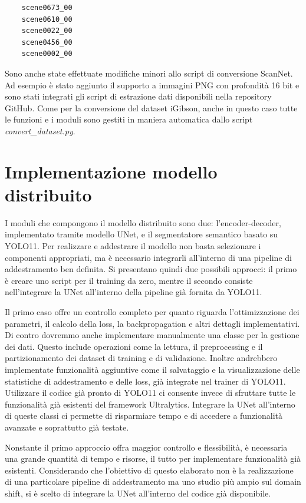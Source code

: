\documentclass[12pt]{report}
\begin{document}
\begin{verbatim}
	scene0673_00
	scene0610_00
	scene0022_00
	scene0456_00
	scene0002_00
\end{verbatim}

Sono anche state effettuate modifiche minori allo script di conversione ScanNet. Ad esempio è stato aggiunto il supporto a immagini PNG con profondità 16 bit e sono stati integrati gli script di estrazione dati disponibili nella repository GitHub. Come per la conversione del dataset iGibson, anche in questo caso tutte le funzioni e i moduli sono gestiti in maniera automatica dallo script \textit{convert\_dataset.py}.

\section{Implementazione modello distribuito}
\label{sec:implementazione_modello_per_distribuito}

I moduli che compongono il modello distribuito sono due: l'encoder-decoder, implementato tramite modello UNet, e il segmentatore semantico basato su YOLO11. Per realizzare e addestrare il modello non basta selezionare i componenti appropriati, ma è necessario integrarli all'interno di una pipeline di addestramento ben definita. Si presentano quindi due possibili approcci: il primo è creare uno script per il training da zero, mentre il secondo consiste nell'integrare la UNet all'interno della pipeline già fornita da YOLO11.

Il primo caso offre un controllo completo per quanto riguarda l'ottimizzazione dei parametri, il calcolo della loss, la backpropagation e altri dettagli implementativi. Di contro dovremmo anche implementare manualmente una classe per la gestione dei dati. Questo include operazioni come la lettura, il preprocessing e il partizionamento dei dataset di training e di validazione. Inoltre andrebbero implementate funzionalità aggiuntive come il salvataggio e la visualizzazione delle statistiche di addestramento e delle loss, già integrate nel trainer di YOLO11. Utilizzare il codice già pronto di YOLO11 ci consente invece di sfruttare tutte le funzionalità già esistenti del framework Ultralytics. Integrare la UNet all'interno di queste classi ci permette di risparmiare tempo e di accedere a funzionalità avanzate e soprattutto già testate.

Nonstante il primo approccio offra maggior controllo e flessibilità, è necessaria una grande quantità di tempo e risorse, il tutto per implementare funzionalità già esistenti. Considerando che l'obiettivo di questo elaborato non è la realizzazione di una particolare pipeline di addestramento ma uno studio più ampio sul domain shift, si è scelto di integrare la UNet all'interno del codice già disponibile.
\end{document}
